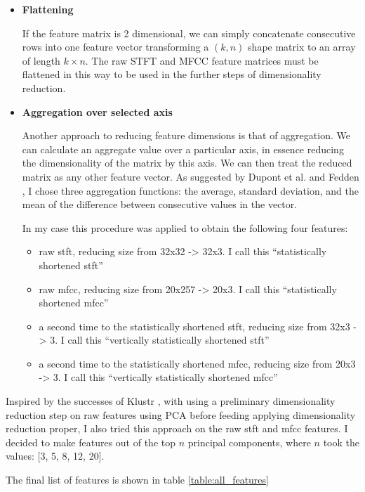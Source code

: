 \documentclass[11pt]{article}
\begin{document}
\begin{itemize}
\item \textbf{ Flattening }

If the feature matrix is 2 dimensional, we can simply concatenate consecutive rows into one feature vector transforming a \((k,n)\) shape matrix to an array of length \(k \times n\). The raw STFT and MFCC feature matrices must be flattened in this way to be used in the further steps of dimensionality reduction.

\item \textbf{ Aggregation over selected axis }

Another approach to reducing feature dimensions is that of aggregation. We can calculate an aggregate value over a particular axis, in essence reducing the dimensionality of the matrix by this axis. We can then treat the reduced matrix as any other feature vector. As suggested by Dupont et al. \cite{Dupont_2013} and Fedden \cite{medium}, I chose three aggregation functions: the average, standard deviation, and the mean of the difference between consecutive values in the vector.

In my case this procedure was applied to obtain the following four features:
\begin{itemize}
\item raw stft, reducing size from 32x32 -> 32x3. I call this ``statistically shortened stft''
\item raw mfcc, reducing size from 20x257 -> 20x3. I call this ``statistically shortened mfcc''
\item a second time to the statistically shortened stft, reducing size from 32x3 -> 3. I call this ``vertically statistically shortened stft''
\item a second time to the statistically shortened mfcc, reducing size from 20x3 -> 3. I call this ``vertically statistically shortened mfcc''
\end{itemize}
\end{itemize}

Inspired by the successes of Klustr \cite{klustr}, with using a preliminary dimensionality reduction step on raw features using PCA before feeding applying dimensionality reduction proper, I also tried this approach on the raw stft and mfcc features. I decided to make features out of the top $n$ principal components, where $n$ took the values: [3, 5, 8, 12, 20].

The final list of features is shown in table \ref{table:all_features}
\end{document}
